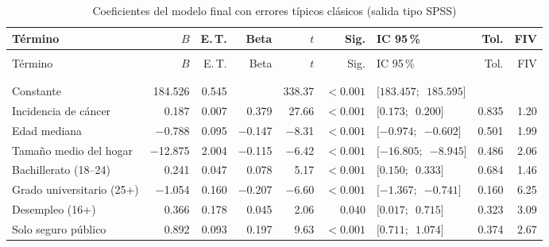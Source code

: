 {\footnotesize
\begin{xltabular}{\linewidth}{>{\raggedright\arraybackslash}X r r r r r l r r}
\caption{Coeficientes del modelo final con errores típicos clásicos (salida tipo SPSS)}\label{tab:spss-coeficientes} \\
\toprule
Término & $B$ & E.\,T. & Beta & $t$ & Sig. & IC 95\,\% & Tol. & FIV \\
\midrule
\endfirsthead
{} \\
\toprule
Término & $B$ & E.\,T. & Beta & $t$ & Sig. & IC 95\,\% & Tol. & FIV \\
\midrule
\endhead
\midrule
{} \\
\endfoot
\bottomrule
{} \\
\endlastfoot
Constante & \num{184.526} & \num{0.545} &  & \num{338.37} & $<\num{0.001}$ & $[\num{183.457};$\allowbreak\ $\num{185.595}]$ &  &  \\
Incidencia de cáncer & \num{0.187} & \num{0.007} & \num{0.379} & \num{27.66} & $<\num{0.001}$ & $[\num{0.173};$\allowbreak\ $\num{0.200}]$ & \num{0.835} & \num{1.20} \\
Edad mediana & \num{-0.788} & \num{0.095} & \num{-0.147} & \num{-8.31} & $<\num{0.001}$ & $[\num{-0.974};$\allowbreak\ $\num{-0.602}]$ & \num{0.501} & \num{1.99} \\
Tamaño medio del hogar & \num{-12.875} & \num{2.004} & \num{-0.115} & \num{-6.42} & $<\num{0.001}$ & $[\num{-16.805};$\allowbreak\ $\num{-8.945}]$ & \num{0.486} & \num{2.06} \\
Bachillerato (18–24) & \num{0.241} & \num{0.047} & \num{0.078} & \num{5.17} & $<\num{0.001}$ & $[\num{0.150};$\allowbreak\ $\num{0.333}]$ & \num{0.684} & \num{1.46} \\
Grado universitario (25+) & \num{-1.054} & \num{0.160} & \num{-0.207} & \num{-6.60} & $<\num{0.001}$ & $[\num{-1.367};$\allowbreak\ $\num{-0.741}]$ & \num{0.160} & \num{6.25} \\
Desempleo (16+) & \num{0.366} & \num{0.178} & \num{0.045} & \num{2.06} & \num{0.040} & $[\num{0.017};$\allowbreak\ $\num{0.715}]$ & \num{0.323} & \num{3.09} \\
Solo seguro público & \num{0.892} & \num{0.093} & \num{0.197} & \num{9.63} & $<\num{0.001}$ & $[\num{0.711};$\allowbreak\ $\num{1.074}]$ & \num{0.374} & \num{2.67} \\

\end{xltabular}}
